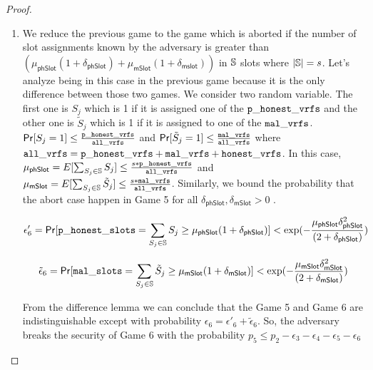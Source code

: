 \begin{proof}
\begin{enumerate}[label={{Game }}{{\arabic*}}]
	\item We reduce the previous game to the game which is aborted if the number of slot assignments known by the adversary is greater than $ (\mu_{\mathsf{phSlot}}(1+\delta_{\mathsf{phSlot}})+ \mu_{\mathsf{mSlot}}(1+\delta_{\mathsf{mslot}})) $ in $ \mathbb{S} $ slots where $ |\mathbb{S}| = s $. Let's analyze being in this case in the previous game because it is the only difference between those two games. We consider two random variable. The first one is $ S_{j} $ which is 1 if it is assigned one of the $ \mathtt{p\_honest\_vrfs} $ and the other one is $ \tilde{S}_j $ which is 1 if it is assigned to one of the $ \mathtt{mal\_vrfs} $. $ \mathsf{Pr}[S_j = 1] \leq \frac{\mathtt{p\_honest\_vrfs}}{\mathtt{all\_vrfs}} $ and $  \mathsf{Pr}[\tilde{S}_j = 1]\leq \frac{\mathtt{mal\_vrfs}}{\mathtt{all\_vrfs}} $ where $ \mathtt{all\_vrfs} = \mathtt{p\_honest\_vrfs} + \mathtt{mal\_vrfs} + \mathtt{honest\_vrfs} $. In this case, $ \mu_{\mathsf{phSlot}} = E[\sum_{S_j \in \mathbb{S}} S_j] \leq \frac{s*\mathtt{p\_honest\_vrfs}}{\mathtt{all\_vrfs}}$ and $ \mu_{\mathsf{mSlot}} = E[\sum_{S_j \in \mathbb{S}} \tilde{S}_j] \leq \frac{s*\mathtt{mal\_vrfs}}{\mathtt{all\_vrfs}}$. Similarly, we bound the probability that the abort case happen in Game 5 for all $ \delta_{\mathsf{phSlot}}, \delta_{\mathsf{mSlot}} > 0 $ .
	
	\begin{equation}\label{eq:malvrf}
	\epsilon'_6 = \mathsf{Pr}[\mathtt{p\_honest\_slots} = \sum_{S_j \in \mathbb{S}} S_{j} \geq \mu_{\mathsf{phSlot}} (1+ \delta_{\mathsf{phSlot}})] < \exp(-\frac{\mu_{\mathsf{phSlot}}\delta_{\mathsf{phSlot}}^2}{(2+\delta_{\mathsf{phSlot}})}) \nonumber
	\end{equation}      
	
	 \begin{equation}\label{eq:malvrf}
	 \tilde{\epsilon}_6 = \mathsf{Pr}[\mathtt{mal\_slots} = \sum_{S_j \in \mathbb{S}} \tilde{S}_{j} \geq \mu_{\mathsf{mSlot}} (1+ \delta_{\mathsf{mSlot}})] < \exp(-\frac{\mu_{\mathsf{mSlot}}\delta_{\mathsf{mSlot}}^2}{(2+\delta_{\mathsf{mSlot}})}) \nonumber
	 \end{equation}   
	
	From the difference lemma we can conclude that the Game 5 and Game 6 are indistinguishable except with probability $ \epsilon_6 = \epsilon'_6  + \tilde{\epsilon}_6 $. So, the adversary breaks the security of Game 6 with the probability $ p_5 \leq p_2 - \epsilon_3  - \epsilon_4 - \epsilon_5 - \epsilon_6$   
	 

\end{enumerate}
\end{proof}

